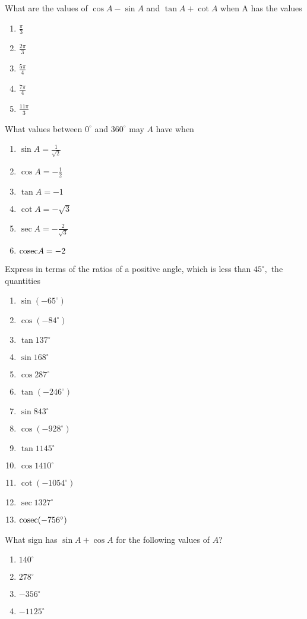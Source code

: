 What are the values of $\cos A - \sin A$ and $\tan A + \cot A$ when A has the values
\begin{enumerate}[resume]
\item $\frac{\pi}{3}$
\item $\frac{2\pi}{3}$
\item $\frac{5\pi}{4}$
\item $\frac{7\pi}{4}$
\item $\frac{11\pi}{3}$
\end{enumerate}

What values between $0^\circ$ and $360^\circ$ may $A$ have when
\begin{enumerate}[resume]
\item $\sin A = \frac{1}{\sqrt{2}}$
\item $\cos A = -\frac{1}{2}$
\item $\tan A = -1$
\item $\cot A = -\sqrt{3}$
\item $\sec A = -\frac{2}{\sqrt{3}}$
\item ${\rm cosec}A = -2$
\end{enumerate}

Express in terms of the ratios of a positive angle, which is less than $45^\circ,$ the quantities
\begin{enumerate}[resume]
\item $\sin(-65^\circ)$
\item $\cos(-84^\circ)$
\item $\tan 137^\circ$
\item $\sin 168^\circ$
\item $\cos 287^\circ$
\item $\tan(-246^\circ)$
\item $\sin 843^\circ$
\item $\cos(-928^\circ)$
\item $\tan 1145^\circ$
\item $\cos 1410^\circ$
\item $\cot(-1054^\circ)$
\item $\sec 1327^\circ$
\item ${\rm cosec}(-756^\circ)$
\end{enumerate}

What sign has $\sin A + \cos A$ for the following values of $A$?
\begin{enumerate}[resume]
\item $140^\circ$
\item $278^\circ$
\item $-356^\circ$
\item $-1125^\circ$
\end{enumerate}

